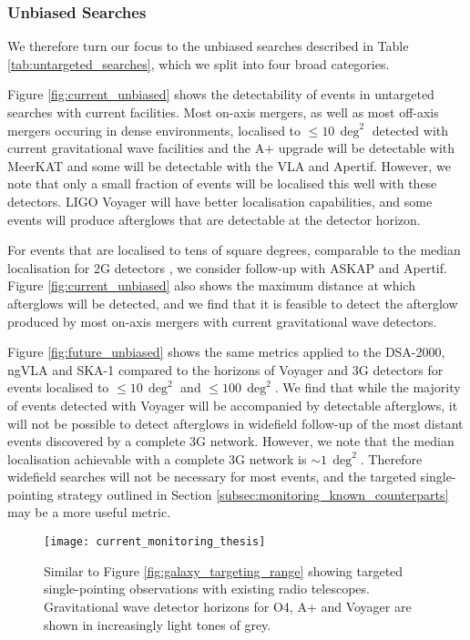 \subsubsection{Unbiased Searches}
We therefore turn our focus to the unbiased searches described in Table \ref{tab:untargeted_searches}, which we split into four broad categories.

Figure \ref{fig:current_unbiased} shows the detectability of events in untargeted searches with current facilities. Most on-axis mergers, as well as most off-axis mergers occuring in dense environments, localised to $\leq 10\,\deg^2$ detected with current gravitational wave facilities and the A+ upgrade will be detectable with MeerKAT and some will be detectable with the VLA and Apertif. However, we note that only a small fraction of events will be localised this well with these detectors. LIGO Voyager will have better localisation capabilities, and some events will produce afterglows that are detectable at the detector horizon.

\pagebreak
For events that are localised to tens of square degrees, comparable to the median localisation for 2G detectors \citep{2018LRR....21....3A}, we consider follow-up with ASKAP and Apertif. Figure \ref{fig:current_unbiased} also shows the maximum distance at which afterglows will be detected, and we find that it is feasible to detect the afterglow produced by most on-axis mergers with current gravitational wave detectors.

Figure \ref{fig:future_unbiased} shows the same metrics applied to the DSA-2000, ngVLA and SKA-1 compared to the horizons of Voyager and 3G detectors for events localised to $\leq 10\,\deg^2$ and $\leq 100\,\deg^2$. We find that while the majority of events detected with Voyager will be accompanied by detectable afterglows, it will not be possible to detect afterglows in widefield follow-up of the most distant events discovered by a complete 3G network. However, we note that the median localisation achievable with a complete 3G network is $\sim 1\,\deg^2$. Therefore widefield searches will not be necessary for most events, and the targeted single-pointing strategy outlined in Section \ref{subsec:monitoring_known_counterparts} may be a more useful metric. 

\begin{figure}
    \centering
    \texttt{[image: current\_monitoring\_thesis]}
    \caption[Monitoring known counterparts with current facilities]{Similar to Figure \ref{fig:galaxy_targeting_range} showing targeted single-pointing observations with existing radio telescopes. Gravitational wave detector horizons for O4, A+ and Voyager are shown in increasingly light tones of grey.}
    \label{fig:current_monitoring}
\end{figure}

